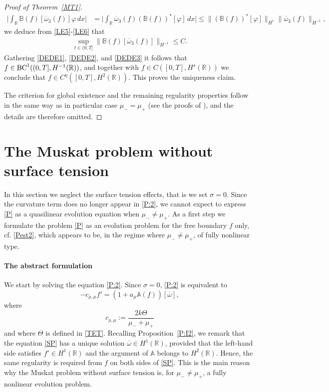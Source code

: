 \documentclass[11pt,reqno]{amsart}
\numberwithin{equation}{section}
\newcommand{\0}{\Omega}
\newcommand{\ov}{\overline}
\newcommand{\oo}{\ov\omega}
\newcommand{\bA}{\mathbb{A}}
\newcommand{\bB}{\mathbb{B}}
\newcommand{\R}{\mathbb{R}}
\numberwithin{equation}{section}
\begin{document}
\begin{proof}[Proof of Theorem~\ref{MT1}]
 \begin{align*}
  \Big|\int_\R \bB(f)[\oo_3(f)]\varphi\, dx\Big|&=\Big|\int_\R  \oo_3(f)(\bB(f))^*[\varphi]\, dx\Big| \leq \|(\bB(f))^*[\varphi]\|_{H^1}\|\oo_3(f)\|_{H^{-1}},
 \end{align*}
 we deduce from  \eqref{LE5}-\eqref{LE6} that 
   \begin{align}\label{DEDE3}
 \sup_{t\in(0,T]}\| \bB(f)[\oo_3(f)]\|_{H^{-1}}\leq C.
 \end{align}
  Gathering \eqref{DEDE1}, \eqref{DEDE2}, and \eqref{DEDE3} it follows that $f\in {\rm BC}^1((0,T], H^{-1}(\R))$, and together with $f\in C([0,T], H^s(\R))$ we conclude that 
  $f\in C^\eta([0,T],H^{2}(\R)).$ This proves the uniqueness claim.
  
  
  The criterion for global existence and the remaining regularity properties follow in the same way as in particular case $\mu_-=\mu_+$ (see the proofs of \cite[Theorem~1.2-1.3]{M16x}), and the details are therefore omitted.
\end{proof}



 



\section{The Muskat problem without surface tension}\label{Sec4}
In this section we neglect the surface tension effects, that is we set $\sigma=0 $.   
 Since  the curvature term does no longer appear  in \eqref{P:2}, we cannot expect  to express \eqref{P} as a quasilinear evolution  equation when $\mu_-\neq\mu_+$.
As a first step we formulate the problem \eqref{P} as an evolution problem for the free boundary $f$ only, cf. \eqref{Pest2},  which appears  to be,  in the regime where $\mu_-\neq \mu_+$, of fully nonlinear type.
 \medskip

\paragraph{\bf The abstract formulation}  
We start by solving  the  equation \eqref{P:2}.
Since $\sigma=0$, \eqref{P:2} is equivalent to
\begin{equation}\label{SP}
- c_{\rho,\mu }f' =(1+a_\mu\bA(f))[\oo],
\end{equation}
where
\[
c_{\rho,\mu}:=\frac{2k\Theta}{\mu_-+\mu_+}
\]
and where $\Theta$ is defined in \eqref{TET}.
Recalling Proposition~\ref{P:I2}, we remark that the equation   \eqref{SP} has a unique solution   $\oo\in H^1(\R)$, provided that the left-hand side satisfies $f'\in H^1(\R)$ and  the argument of $\bA$   belongs to  $ H^2(\R)$.
Hence, the same regularity  is required from $f$ on both sides of \eqref{SP}. 
 This is  the main reason  why the Muskat problem without surface tension is, for $\mu_-\neq \mu_+$, a fully nonlinear evolution problem.
 
\end{document}
